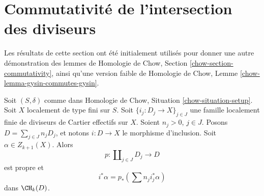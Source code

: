 \section{Commutativité de l'intersection des diviseurs}
\label{section-commutativity}

\noindent
Les résultats de cette section ont été initialement utilisés pour donner une autre
démonstration des lemmes de Homologie de Chow, Section \ref{chow-section-commutativity},
ainsi qu'une version faible de
Homologie de Chow, Lemme \ref{chow-lemma-gysin-commutes-gysin}.

\begin{lemma}
\label{lemma-improved-additivity}
Soit $(S, \delta)$ comme dans Homologie de Chow, Situation \ref{chow-situation-setup}.
Soit $X$ localement de type fini sur $S$.
Soit $\{i_j : D_j \to X \}_{j \in J}$ une famille localement finie
de diviseurs de Cartier effectifs sur $X$. Soient $n_j > 0$, $j\in J$.
Posons $D = \sum_{j \in J} n_j D_j$, et notons $i : D \to X$ le
morphisme d'inclusion. Soit $\alpha \in Z_{k + 1}(X)$. Alors
$$
p : \coprod\nolimits_{j \in J} D_j \longrightarrow D
$$
est propre et
$$
i^*\alpha = p_*\left(\sum n_j i_j^*\alpha\right)
$$
dans $\CH_k(D)$.
\end{lemma}

